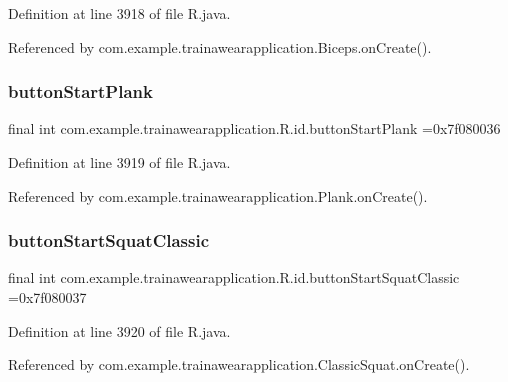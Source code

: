 Definition at line 3918 of file R.\+java.



Referenced by com.\+example.\+trainawearapplication.\+Biceps.\+on\+Create().

\mbox{\label{classcom_1_1example_1_1trainawearapplication_1_1_r_1_1id_a206fd9cf84aad86924005a12c7dd90d7}} 
\subsubsection{\texorpdfstring{buttonStartPlank}{buttonStartPlank}}
{\footnotesize\ttfamily final int com.\+example.\+trainawearapplication.\+R.\+id.\+button\+Start\+Plank =0x7f080036\hspace{0.3cm}{\ttfamily [static]}}



Definition at line 3919 of file R.\+java.



Referenced by com.\+example.\+trainawearapplication.\+Plank.\+on\+Create().

\mbox{\label{classcom_1_1example_1_1trainawearapplication_1_1_r_1_1id_a2188491e7e153f7fb3dbf4de4b60942f}} 
\subsubsection{\texorpdfstring{buttonStartSquatClassic}{buttonStartSquatClassic}}
{\footnotesize\ttfamily final int com.\+example.\+trainawearapplication.\+R.\+id.\+button\+Start\+Squat\+Classic =0x7f080037\hspace{0.3cm}{\ttfamily [static]}}



Definition at line 3920 of file R.\+java.



Referenced by com.\+example.\+trainawearapplication.\+Classic\+Squat.\+on\+Create().

